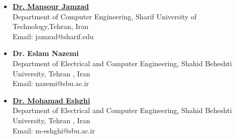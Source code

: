 \documentclass[10pt]{res}
\begin{document}
\begin{resume}
\begin{itemize}

\item   {\bf \href{http://ce.sharif.edu/~jamzad} {Dr. Mansour Jamzad} }\\
Department of Computer Engineering, Sharif University of Technology,Tehran, Iran\\
Email: jamzad@sharif.edu

\item   {\bf  Dr. Eslam Nazemi}\\
Department of Electrical and Computer Engineering, Shahid Beheshti University, Tehran , Iran\\
Email: nazemi@sbu.ac.ir

\item   {\bf \href{http://facultymembers.sbu.ac.ir/eshghi/}{Dr. Mohamad Eshghi} }\\
Department of Electrical and Computer Engineering, Shahid Beheshti University, Tehran , Iran\\
Email: m-eshghi@sbu.ac.ir

\end{itemize}

\end{resume}
\end{document}
